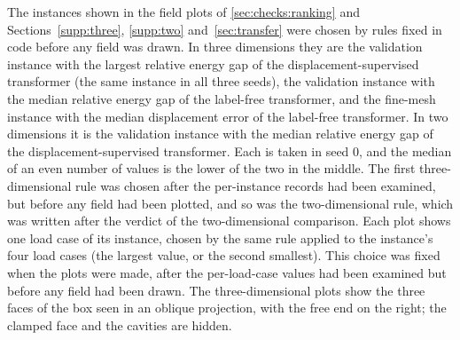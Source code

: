 The instances shown in the field plots of \cref{sec:checks:ranking} and
Sections~\ref{supp:three}, \ref{supp:two} and~\ref{sec:transfer} were chosen by rules fixed in code before any field was drawn. In three dimensions they are
the validation instance with the largest relative energy gap of the displacement-supervised
transformer (the same instance in all three seeds), the validation instance with the median
relative energy gap of the label-free transformer, and the fine-mesh instance with the median
displacement error of the label-free transformer. In two dimensions it is the validation
instance with the median relative energy gap of the displacement-supervised transformer. Each
is taken in seed 0, and the median of an even number of values is the lower of the two in
the middle. The first three-dimensional rule was chosen after the
per-instance records had been examined, but before any field had been plotted, and so was
the two-dimensional rule, which was written after the verdict of the two-dimensional
comparison. Each plot shows one load
case of its instance, chosen by the same rule applied to the instance's four load cases (the largest value, or the second smallest). This choice was fixed when the plots were made, after the
per-load-case values had been examined but before any field had been drawn. The
three-dimensional plots show the three faces of the box seen in an oblique projection, with
the free end on the right; the clamped face and the cavities are hidden.

